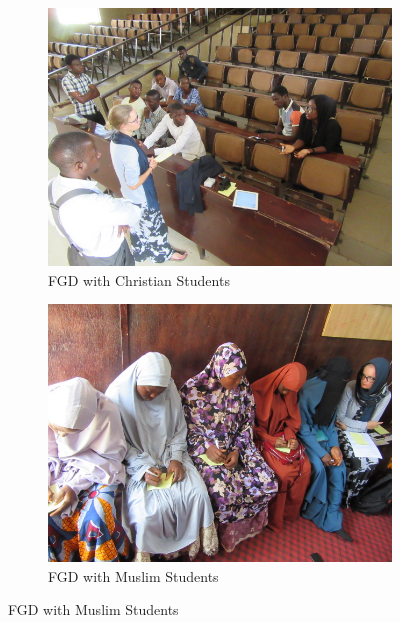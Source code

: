 \begin{figure}[H]
\bigskip
\begin{subfigure}{0.485\textwidth}
\includegraphics[width=\linewidth]{Chapter_6/conclusion-figure9.JPG}
\caption{FGD with Christian Students} \label{fig:e}
\end{subfigure}\hspace*{\fill}
\begin{subfigure}{0.485\textwidth}
\includegraphics[width=\linewidth]{Chapter_6/conclusion-figure7.JPG}
\caption{FGD with Muslim Students} \label{fig:f}
\end{subfigure}


\end{figure}
